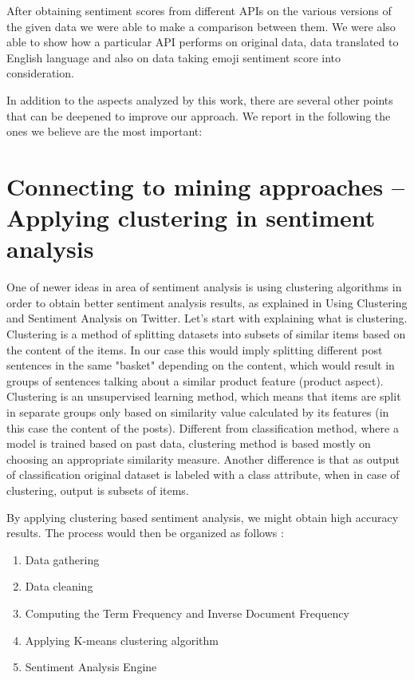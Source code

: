After obtaining sentiment scores from different APIs on the various versions of the given data we were able to make a comparison between them. We were also able to show how a particular API performs on original data, data translated to English language and also on data taking emoji sentiment score into consideration.

In addition to the aspects analyzed by this work, there are several other points that can be deepened to improve our approach. We report in the following the ones we believe are the most important:

\section{Connecting to mining approaches – Applying clustering in sentiment analysis}

One of newer ideas in area of sentiment analysis is using clustering algorithms in order to obtain better sentiment analysis results, as explained in Using Clustering and Sentiment Analysis on Twitter\cite{Clustering}. Let's start with explaining what is clustering. Clustering is a method of splitting datasets into subsets of similar items based on the content of the items. In our case this would imply splitting different post sentences in the same "basket" depending on the content, which would result in groups of sentences talking about a similar product feature (product aspect). 
Clustering is an unsupervised learning method, which means that items are split in separate groups only based on similarity value calculated by its features (in this case the content of the posts). Different from classification method, where a model is trained based on past data, clustering method is based mostly on choosing an appropriate similarity measure. Another difference is that as output of classification original dataset is labeled with a class attribute, when in case of clustering, output is subsets of items. 

By applying clustering based sentiment analysis, we might obtain high accuracy results. The process would then be organized as follows : 
\begin{enumerate}
	\item Data gathering
	\item Data cleaning
	\item Computing the Term Frequency and Inverse Document Frequency
	\item Applying K-means clustering algorithm
	\item Sentiment Analysis Engine
\end{enumerate}


